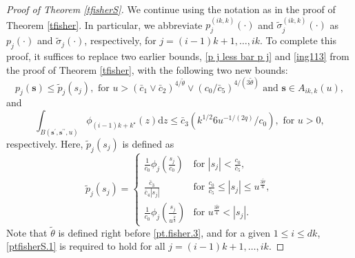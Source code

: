 \documentclass[ejsv2]{imsart}
\theoremstyle{plain}
\theoremstyle{definition}
\theoremstyle{remark}
\begin{document}
\begin{appendix}
\begin{proof}[Proof of Theorem \ref{tfisherS}]
{
We continue using the notation as in the proof of
Theorem \ref{tfisher}.
In particular, we
abbreviate 
$p^{(ik,k)}_j(\cdot)$ and $\tilde{\sigma}^{(ik,k)}_j(\cdot)$ as $p_j(\cdot)$ and $\tilde{\sigma}_j(\cdot)$, respectively,
for
$j=(i-1)k+1,\ldots,ik$.
To complete this proof, it suffices to replace two earlier bounds, \eqref{p j less bar p j}
and \eqref{ing113} from the proof of Theorem \ref{tfisher},
with the following two new bounds:
\begin{equation}\label{ptfisherS.1}
p_j(\mathbf{s})\leq\tilde{p}_j(s_j), \,\,\mbox{for}\,\,u> (\bar{c}_1\vee\bar{c}_2)^{4/\tilde{\theta}} \vee
(c_0/\bar{c}_5)^{4/(3\tilde{\theta})} \,\,\mbox{and}\,\,
 \mathbf{s}\in A_{ik,k}(u),
\end{equation}
and 
\begin{equation}\label{ptfisherS.2}
\int_{B(\mathbf{s}^{\prime},\mathbf{s}^{\prime\prime},u)}\phi_{(i-1)k+k^{\star}}(z)\mathrm{d}z\leq \bar{c}_3(k^{1/2}6u^{-1/(2q)}/c_0),\,\,\mbox{for}\,\, u>0,
\end{equation}
respectively.
Here, $\tilde{p}_j(s_j)$ is defined as
\begin{equation*}
\tilde{p}_j(s_j)= 
  \begin{cases}
    \frac{1}{c_0}\phi_j(\frac{s_j}{c_0}) & \mbox{for } |s_j|<\frac{c_0}{\bar{c}_5}, \\
    \frac{\bar{c}_3}{\bar{c}_4|s_j|} & \mbox{for } \frac{c_0}{\bar{c}_5}\leq|s_j|\leq u^{\frac{3\tilde{\theta}}{4}}, \\
    \frac{1}{c_0}\phi_j(\frac{s_j}{u^{\frac{\tilde{\theta}}{2}}}) & \mbox{for } u^{\frac{3\tilde{\theta}}{4}}<|s_j|.
  \end{cases}
\end{equation*}
Note that
$\tilde{\theta}$ is defined right before \eqref{pt.fisher.3},
and for a given $1\leq i \leq dk$,
\eqref{ptfisherS.1}
is required to hold
for all
$j=(i-1)k+1,\ldots,ik$.

}
\end{proof}
\end{appendix}
\end{document}
